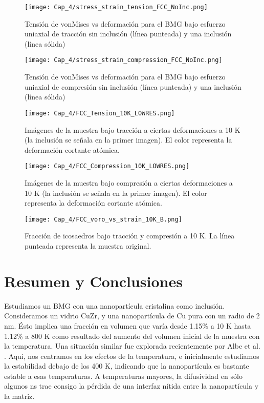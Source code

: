 \begin{figure}[htp]
\centering
\texttt{[image: Cap\_4/stress\_strain\_tension\_FCC\_NoInc.png]}
\caption[vonMises vs deformación (tracción)]{Tensión de vonMises vs deformación para el BMG bajo esfuerzo uniaxial de tracción sin inclusión (línea punteada) y una inclusión (línea sólida)}
\label{C4:fg:fcc_vm_tension}
\end{figure}

\begin{figure}[htp]
\centering
\texttt{[image: Cap\_4/stress\_strain\_compression\_FCC\_NoInc.png]}
\caption[vonMises vs deformación (compresión)]{Tensión de vonMises vs deformación para el BMG bajo esfuerzo uniaxial de compresión sin inclusión (línea punteada) y una inclusión (línea sólida)}
\label{C4:fg:fcc_vm_compression}
\end{figure}

\begin{figure}[htp]
\centering
\texttt{[image: Cap\_4/FCC\_Tension\_10K\_LOWRES.png]}
\caption[Muestra bajo tracción a 10K]{Imágenes de la muestra bajo tracción a ciertas deformaciones a 10 K (la inclusión se señala en la primer imagen). El color representa la deformación cortante atómica.}
\label{C4:fg:fcc_tension_bmg_10K}
\end{figure}

\begin{figure}[htp]
\centering
\texttt{[image: Cap\_4/FCC\_Compression\_10K\_LOWRES.png]}
\caption[Muestra bajo compresión a 10K]{Imágenes de la muestra bajo compresión a ciertas deformaciones a 10 K (la inclusión se señala en la primer imagen). El color representa la deformación cortante atómica.}
\label{C4:fg:fcc_compression_bmg_10K}
\end{figure}

\begin{figure}[htp]
\centering
\texttt{[image: Cap\_4/FCC\_voro\_vs\_strain\_10K\_B.png]}
\caption[Fracción de icosaedros a 10K]{Fracción de icosaedros bajo tracción y compresión a 10 K. La línea punteada representa la muestra original.}
\label{C4:fg:fcc_voro_10K}
\end{figure}

\section{Resumen y Conclusiones}
\label{S4_4}

Estudiamos un BMG con una nanopartícula cristalina como inclusión. Consideramos un vidrio CuZr, y una nanopartícula de Cu pura con un radio de 2 nm. Ésto implica una fracción en volumen que varía desde 1.15\% a 10 K hasta 1.12\% a 800 K como resultado del aumento del volumen inicial de la muestra con la temperatura. Una situación similar fue explorada recientemente por Albe et al. \cite{albe13}. Aquí, nos centramos en los efectos de la temperatura, e inicialmente estudiamos la estabilidad debajo de los 400 K, indicando que la nanopartícula es bastante estable a esas temperaturas. A temperaturas mayores, la difusividad en sólo algunos ns trae consigo la pérdida de una interfaz nítida entre la nanopartícula y la matriz.

